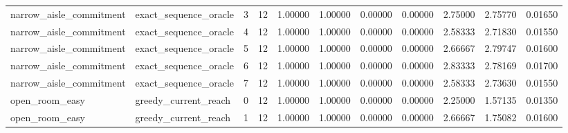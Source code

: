 \documentclass{article}
\begin{document}
\begin{table}[tbp]
{\begin{tabular}{lllllllllll}
narrow\_aisle\_commitment & exact\_sequence\_oracle & 3 & 12 & 1.00000 & 1.00000 & 0.00000 & 0.00000 & 2.75000 & 2.75770 & 0.01650 \\
narrow\_aisle\_commitment & exact\_sequence\_oracle & 4 & 12 & 1.00000 & 1.00000 & 0.00000 & 0.00000 & 2.58333 & 2.71830 & 0.01550 \\
narrow\_aisle\_commitment & exact\_sequence\_oracle & 5 & 12 & 1.00000 & 1.00000 & 0.00000 & 0.00000 & 2.66667 & 2.79747 & 0.01600 \\
narrow\_aisle\_commitment & exact\_sequence\_oracle & 6 & 12 & 1.00000 & 1.00000 & 0.00000 & 0.00000 & 2.83333 & 2.78169 & 0.01700 \\
narrow\_aisle\_commitment & exact\_sequence\_oracle & 7 & 12 & 1.00000 & 1.00000 & 0.00000 & 0.00000 & 2.58333 & 2.73630 & 0.01550 \\
open\_room\_easy & greedy\_current\_reach & 0 & 12 & 1.00000 & 1.00000 & 0.00000 & 0.00000 & 2.25000 & 1.57135 & 0.01350 \\
open\_room\_easy & greedy\_current\_reach & 1 & 12 & 1.00000 & 1.00000 & 0.00000 & 0.00000 & 2.66667 & 1.75082 & 0.01600 \\
\bottomrule
\end{tabular}
}
\end{table}

\clearpage
\end{document}
